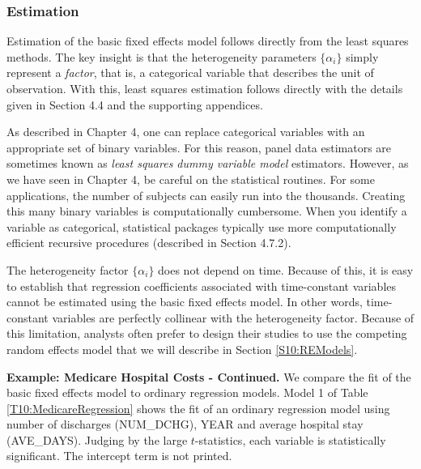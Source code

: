 \subsubsection*{Estimation}

Estimation of the basic fixed effects model follows directly from
the least squares methods. The key insight is that the heterogeneity
parameters $\{\alpha_i\}$ simply represent a \emph{factor}, that is,
a categorical variable that describes the unit of observation. With
this, least squares estimation follows directly with the details
given in Section 4.4 and the supporting appendices.


As described in Chapter 4, one can replace categorical variables
with an appropriate set of binary variables. For this reason, panel
data estimators are sometimes known as \emph{least squares dummy
variable model} estimators. However, as we have seen in Chapter 4,
be careful on the statistical routines. For some applications, the
number of subjects can easily run into the thousands. Creating this
many binary variables is computationally cumbersome. When you
identify a variable as categorical, statistical packages typically
use more computationally efficient recursive procedures (described
in Section 4.7.2).


The heterogeneity factor $\{ \alpha_i \}$ does not depend on time.
Because of this, it is easy to establish that regression
coefficients associated with time-constant variables cannot be
estimated using the basic fixed effects model. In other words,
time-constant variables are perfectly collinear with the
heterogeneity factor. Because of this limitation, analysts often
prefer to design their studies to use the competing random effects
model that we will describe in Section \ref{S10:REModels}.

\newpage

\linejed

\textbf{Example: Medicare Hospital Costs - Continued.} We compare
the fit of the basic fixed effects model to ordinary regression
models. Model 1 of Table \ref{T10:MedicareRegression} shows the fit
of an ordinary regression model using number of discharges
(NUM\_DCHG), YEAR and average hospital stay (AVE\_DAYS). Judging by
the large $t$-statistics, each variable is statistically
significant. The intercept term is not printed.

